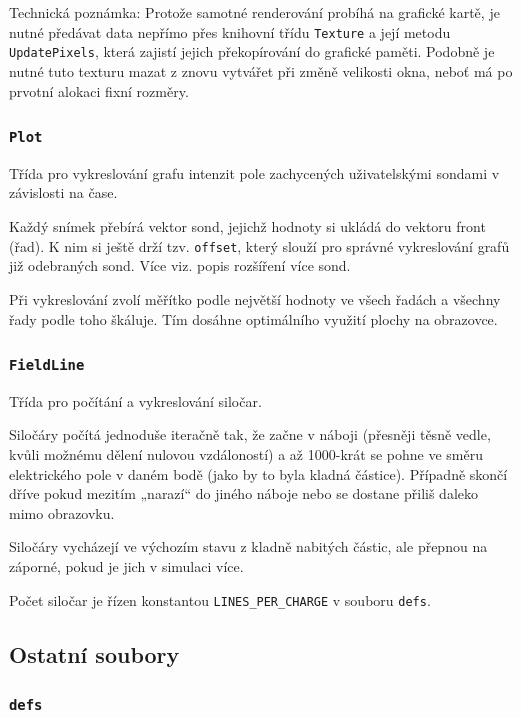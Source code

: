 \documentclass[12pt,a4paper]{article}
\newcommand{\code}[1]{\texttt{#1}}
\begin{document}
Technická poznámka: Protože samotné renderování probíhá na grafické kartě, je
nutné předávat data nepřímo přes knihovní třídu \code{Texture} a její metodu
\code{UpdatePixels}, která zajistí jejich překopírování do grafické paměti.
Podobně je nutné tuto texturu mazat z znovu vytvářet při změně velikosti okna,
neboť má po prvotní alokaci fixní rozměry.

\subsubsection{\code{Plot}}
\label{sec:plot}

Třída pro vykreslování grafu intenzit pole zachycených uživatelskými sondami v
závislosti na čase. 

Každý snímek přebírá vektor sond, jejichž hodnoty si ukládá do vektoru front
(řad). K nim si ještě drží tzv. \code{offset}, který slouží pro správné
vykreslování grafů již odebraných sond. Více viz. popis rozšíření více sond.

Při vykreslování zvolí měřítko podle největší hodnoty ve všech řadách a všechny
řady podle toho škáluje. Tím dosáhne optimálního využití plochy na obrazovce.

\subsubsection{\code{FieldLine}}
\label{sec:fieldline}

Třída pro počítání a vykreslování siločar.

Siločáry počítá jednoduše iteračně tak, že začne v náboji (přesněji těsně vedle,
kvůli možnému dělení nulovou vzdáloností) a až 1000-krát se pohne ve směru
elektrického pole v daném bodě (jako by to byla kladná částice). Případně skončí
dříve pokud mezitím „narazí“ do jiného náboje nebo se dostane přiliš daleko mimo
obrazovku.

Siločáry vycházejí ve výchozím stavu z kladně nabitých částic, ale přepnou na
záporné, pokud je jich v simulaci více.

Počet siločar je řízen konstantou \code{LINES\_PER\_CHARGE} v souboru \code{defs}.

\subsection{Ostatní soubory}

\subsubsection{\code{defs}}
\end{document}
